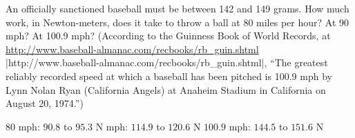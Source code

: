\begin{exercises}
\begin{exercise} An officially sanctioned baseball must be between 142 and
149 grams. How much work, in Newton-meters, does it take to throw a
ball at 80 miles per hour? At 90 mph? At 100.9 mph?  (According to the
Guinness Book of World Records, at
\url{http://www.baseball-almanac.com/recbooks/rb_guin.shtml}
{\vb|http://www.baseball-almanac.com/recbooks/rb_guin.shtml|}\endurl, ``The
greatest reliably recorded speed at which a baseball has been pitched
is 100.9 mph by Lynn Nolan Ryan (California Angels) at Anaheim Stadium
in California on August 20, 1974.'')
\begin{answer} 80 mph: $90.8$ to $95.3$ N\hfill{} mph: $114.9$ to $120.6$ N\hfill\break
$100.9$ mph: $144.5$ to $151.6$ N
\end{answer}\end{exercise}

\end{exercises}
